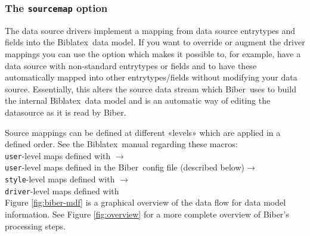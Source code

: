 \documentclass{ltxdockit}
\newcommand*{\biber}{Biber\xspace}
\newcommand*{\biblatex}{Biblatex\xspace}
\begin{document}
\subsubsection{The \texttt{sourcemap} option}\label{map}

The data source drivers implement a mapping from data source
entrytypes and fields into the \biblatex\ data model. If you want to
override or augment the driver mappings you can use the
 option which makes it possible to, for example, have a
data source with non-standard entrytypes or fields and to have these
automatically mapped into other entrytypes/fields without modifying
your data source.  Essentially, this alters the source data stream
which \biber\ uses to build the internal \biblatex\ data model and is an
automatic way of editing the datasource as it is read by \biber.

Source mappings can be defined at different «levels» which are applied
in a defined order. See the \biblatex\ manual regarding these macros:\\[2ex]

\noindent \texttt{user}-level maps defined with $\rightarrow$\\
\hspace*{1em}\texttt{user}-level maps defined in the \biber\ config file (described below)$\rightarrow$\\
\hspace*{2em}\texttt{style}-level maps defined with $\rightarrow$\\
\hspace*{3em}\texttt{driver}-level maps defined with \\[2ex]

Figure \ref{fig:biber-mdf} is a graphical overview of the data flow for
data model information. See Figure \ref{fig:overview} for a more complete
overview of \biber's processing steps.
\end{document}
